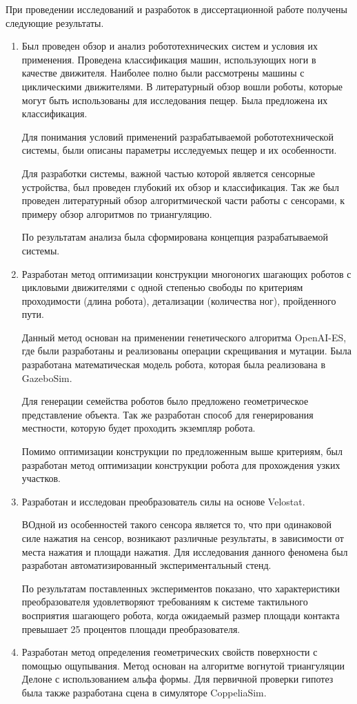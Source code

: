 При  проведении  исследований  и  разработок  в  диссертационной  работе  получены следующие результаты.
\begin{enumerate}
  \item Был проведен обзор и анализ робототехнических систем и условия их применения. Проведена классификация машин, использующих ноги в качестве движителя. Наиболее полно были рассмотрены машины с циклическими движителями. В литературный обзор вошли роботы, которые могут быть использованы для исследования пещер. Была предложена их классификация.

  Для понимания условий применений разрабатываемой робототехнической системы, были описаны параметры исследуемых пещер и их особенности.

  Для разработки системы, важной частью которой является сенсорные устройства, был проведен глубокий их обзор и классификация. Так же был проведен литературный обзор алгоритмической части работы с сенсорами, к примеру обзор алгоритмов по триангуляцию.

  По результатам анализа была сформирована концепция разрабатываемой системы.
  \item Разработан метод оптимизации конструкции многоногих шагающих роботов с цикловыми движителями с одной степенью свободы по критериям проходимости (длина робота), детализации (количества ног), пройденного пути.

  Данный метод основан на применении генетического алгоритма OpenAI-ES, где были разработаны и реализованы операции скрещивания и мутации. Была разработана математическая модель робота, которая была реализована в GazeboSim. 
  
  Для генерации семейства роботов было предложено геометрическое представление объекта. Так же разработан способ для генерирования местности, которую будет проходить экземпляр робота.

  Помимо оптимизации конструкции по предложенным выше критериям, был разработан метод оптимизации конструкции робота для прохождения узких участков.
  \item Разработан и исследован преобразователь силы на основе Velostat.

  ВОдной из особенностей такого сенсора является то, что при одинаковой силе нажатия на сенсор, возникают различные результаты, в зависимости от места нажатия и площади нажатия. Для исследования данного феномена был разработан автоматизированный экспериментальный стенд. 
  
  По результатам поставленных экспериментов показано, что характеристики преобразователя удовлетворяют требованиям к системе тактильного восприятия шагающего робота, когда ожидаемый размер площади контакта превышает 25 процентов площади преобразователя.
  \item Разработан метод определения геометрических свойств поверхности с помощью ощупывания. Метод основан на алгоритме вогнутой триангуляции Делоне с использованием альфа формы. Для первичной проверки гипотез была также разработана сцена в симуляторе CoppeliaSim.


\end{enumerate}
